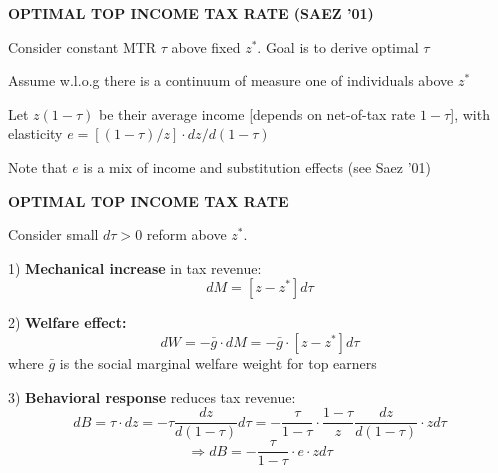 \documentclass[landscape]{slides}
\begin{document}
\begin{slide}
\begin{center}
{\bf OPTIMAL TOP INCOME TAX RATE (SAEZ '01)}
\end{center}
Consider constant MTR $\tau$ above fixed $z^*$. Goal is to
derive optimal $\tau$


Assume w.l.o.g there is a continuum of measure one of individuals above $z^*$

Let
$z(1-\tau)$ be their average income [depends on net-of-tax rate
$1-\tau$], with elasticity $e=[(1-\tau)/z]\cdot
d z/d(1-\tau)$

Note that $e$ is a mix of income and substitution effects (see Saez '01)


\end{slide}


\begin{slide}

\end{slide}

\begin{slide}
\begin{center}
{\bf OPTIMAL TOP INCOME TAX RATE}
\end{center}
Consider small $d\tau>0$ reform above $z^*$.

1) {\bf Mechanical increase} in tax revenue: $$dM=
[z-z^*] d\tau$$

2) {\bf Welfare effect:} $$dW=-\bar{g} \cdot dM = -\bar{g} \cdot [z-z^*] d\tau$$ where $\bar{g}$ is the social marginal welfare weight for top earners


3) {\bf Behavioral response} reduces tax revenue:
$$dB=  \tau \cdot dz= - \tau \frac{dz}{d(1-\tau)}d\tau = -
\frac{\tau}{1-\tau} \cdot \frac{1-\tau}{z}
\frac{dz}{d(1-\tau)} \cdot z d\tau$$ $$\Rightarrow dB=  - 
 \frac{\tau}{1-\tau} \cdot  e \cdot z d\tau$$ 
 

\end{slide}
\end{document}
